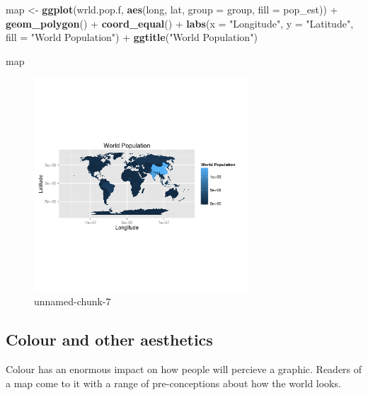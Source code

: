\documentclass[]{article}
\newenvironment{Shaded}{}{}
\newcommand{\KeywordTok}[1]{\textcolor[rgb]{0.00,0.44,0.13}{\textbf{{#1}}}}
\newcommand{\DataTypeTok}[1]{\textcolor[rgb]{0.56,0.13,0.00}{{#1}}}
\newcommand{\StringTok}[1]{\textcolor[rgb]{0.25,0.44,0.63}{{#1}}}
\newcommand{\NormalTok}[1]{{#1}}
\let\Oldincludegraphics\includegraphics
\renewcommand{\includegraphics}[1]{\Oldincludegraphics[width=8cm]{#1}}
\begin{document}
\begin{Shaded}
\begin{Highlighting}[]
\NormalTok{map <- }\KeywordTok{ggplot}\NormalTok{(wrld.pop.f, }\KeywordTok{aes}\NormalTok{(long, lat, }\DataTypeTok{group =} \NormalTok{group, }\DataTypeTok{fill =} \NormalTok{pop_est)) + }\KeywordTok{geom_polygon}\NormalTok{() + }
    \KeywordTok{coord_equal}\NormalTok{() + }\KeywordTok{labs}\NormalTok{(}\DataTypeTok{x =} \StringTok{"Longitude"}\NormalTok{, }\DataTypeTok{y =} \StringTok{"Latitude"}\NormalTok{, }\DataTypeTok{fill =} \StringTok{"World Population"}\NormalTok{) + }
    \KeywordTok{ggtitle}\NormalTok{(}\StringTok{"World Population"}\NormalTok{)}

\NormalTok{map}
\end{Highlighting}
\end{Shaded}
\begin{figure}[htbp]
\centering
\includegraphics{figure/unnamed-chunk-7.png}
\caption{unnamed-chunk-7}
\end{figure}

\subsection{Colour and other aesthetics}

Colour has an enormous impact on how people will percieve a graphic.
Readers of a map come to it with a range of pre-conceptions about how
the world looks.
\end{document}
